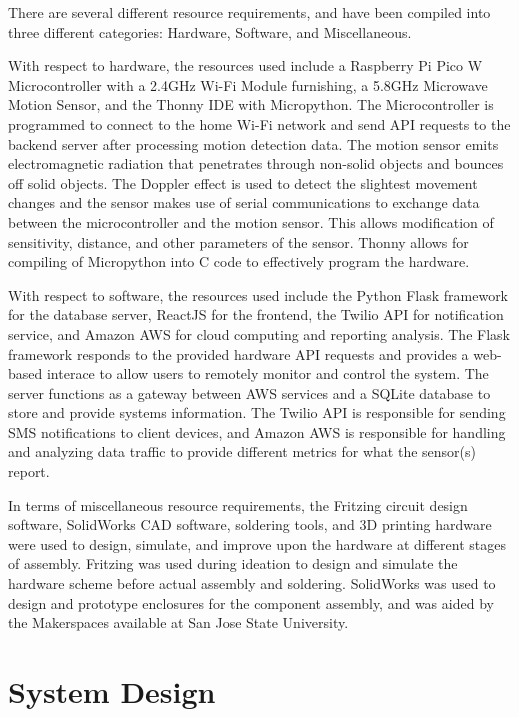 \documentclass[conference]{IEEEtran}
\begin{document}
There are several different resource requirements, and have been compiled into three
different categories: Hardware, Software, and Miscellaneous.

With respect to hardware, the resources used include a Raspberry Pi Pico W Microcontroller
with a 2.4GHz Wi-Fi Module furnishing, a 5.8GHz Microwave Motion Sensor, and the Thonny IDE
with Micropython. The Microcontroller is programmed to connect to the home Wi-Fi network and
send API requests to the backend server after processing motion detection data. The motion
sensor emits electromagnetic radiation that penetrates through non-solid objects and bounces
off solid objects. The Doppler effect is used to detect the slightest movement changes and
the sensor makes use of serial communications to exchange data between the microcontroller
and the motion sensor. This allows modification of sensitivity, distance, and other
parameters of the sensor. Thonny allows for compiling of Micropython into C code to
effectively program the hardware.

With respect to software, the resources used include the Python Flask framework for the
database server, ReactJS for the frontend, the Twilio API for notification service,
and Amazon AWS for cloud computing and reporting analysis. The Flask framework responds
to the provided hardware API requests and provides a web-based interace to allow users
to remotely monitor and control the system. The server functions as a gateway between
AWS services and a SQLite database to store and provide systems information. The
Twilio API is responsible for sending SMS notifications to client devices, and Amazon
AWS is responsible for handling and analyzing data traffic to provide different metrics
for what the sensor(s) report.

In terms of miscellaneous resource requirements, the Fritzing circuit design software,
SolidWorks CAD software, soldering tools, and 3D printing hardware were used to design,
simulate, and improve upon the hardware at different stages of assembly. Fritzing was
used during ideation to design and simulate the hardware scheme before actual assembly
and soldering. SolidWorks was used to design and prototype enclosures for the component
assembly, and was aided by the Makerspaces available at San Jose State University.

\section{System Design}
\end{document}

